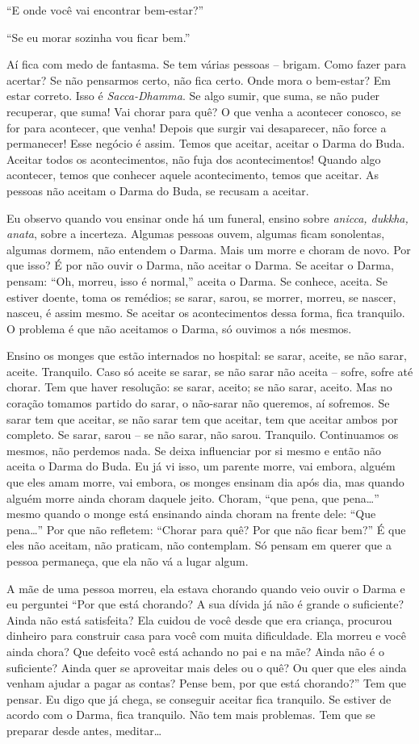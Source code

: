 “E onde você vai encontrar bem-estar?”

“Se eu morar sozinha vou ficar bem.”

Aí fica com medo de fantasma. Se tem várias pessoas – brigam. Como
fazer para acertar? Se não pensarmos certo, não fica certo. Onde mora o
bem-estar? Em estar correto. Isso é \textit{Sacca-Dhamma}. Se algo
sumir, que suma, se não puder recuperar, que suma! Vai chorar para quê?
O que venha a acontecer conosco, se for para acontecer, que venha!
Depois que surgir vai desaparecer, não force a permanecer! Esse negócio
é assim. Temos que aceitar, aceitar o Darma do Buda. Aceitar todos os
acontecimentos, não fuja dos acontecimentos! Quando algo acontecer,
temos que conhecer aquele acontecimento, temos que aceitar. As pessoas
não aceitam o Darma do Buda, se recusam a aceitar. 

Eu observo quando vou ensinar onde há um funeral, ensino sobre
\textit{anicca, dukkha, anata}, sobre a incerteza. Algumas pessoas
ouvem, algumas ficam sonolentas, algumas dormem, não entendem o Darma.
Mais um morre e choram de novo. Por que isso? É por não ouvir o Darma,
não aceitar o Darma. Se aceitar o Darma, pensam: “Oh, morreu, isso é
normal,” aceita o Darma. Se conhece, aceita. Se estiver doente, toma os
remédios; se sarar, sarou, se morrer, morreu, se nascer, nasceu, é
assim mesmo. Se aceitar os acontecimentos dessa forma, fica tranquilo.
O problema é que não aceitamos o Darma, só ouvimos a nós mesmos.

Ensino os monges que estão internados no hospital: se sarar, aceite,
se não sarar, aceite. Tranquilo. Caso só aceite se sarar, se não sarar
não aceita – sofre, sofre até chorar. Tem que haver resolução: se
sarar, aceito; se não sarar, aceito. Mas no coração tomamos partido do
sarar, o não-sarar não queremos, aí sofremos. Se sarar tem que aceitar,
se não sarar tem que aceitar, tem que aceitar ambos por completo. Se
sarar, sarou – se não sarar, não sarou. Tranquilo. Continuamos os
mesmos, não perdemos nada. Se deixa influenciar por si mesmo e então
não aceita o Darma do Buda. Eu já vi isso, um parente morre, vai
embora, alguém que eles amam morre, vai embora, os monges ensinam dia
após dia, mas quando alguém morre ainda choram daquele jeito. Choram,
“que pena, que pena…” mesmo quando o monge está ensinando ainda choram
na frente dele: “Que pena…” Por que não refletem: “Chorar para quê? Por
que não ficar bem?” É que eles não aceitam, não praticam, não
contemplam. Só pensam em querer que a pessoa permaneça, que ela não vá
a lugar algum.

A mãe de uma pessoa morreu, ela estava chorando quando veio ouvir o
Darma e eu perguntei “Por que está chorando? A sua dívida já não é
grande o suficiente? Ainda não está satisfeita? Ela cuidou de você
desde que era criança, procurou dinheiro para construir casa para você
com muita dificuldade. Ela morreu e você ainda chora? Que defeito você
está achando no pai e na mãe? Ainda não é o suficiente? Ainda quer se
aproveitar mais deles ou o quê? Ou quer que eles ainda venham ajudar a
pagar as contas? Pense bem, por que está chorando?” Tem que pensar. Eu
digo que já chega, se conseguir aceitar fica tranquilo. Se estiver de
acordo com o Darma, fica tranquilo. Não tem mais problemas. Tem que se
preparar desde antes, meditar…
